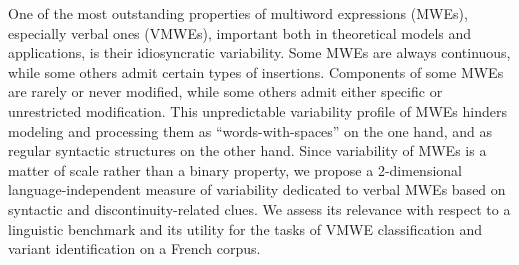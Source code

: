 One of the most outstanding properties of multiword expressions (MWEs), especially verbal ones (VMWEs), important both in theoretical models and applications, is their idiosyncratic variability. Some MWEs are always continuous, while some others admit certain types of insertions. Components of some MWEs  are rarely or never modified, while some others admit either specific or unrestricted modification. This unpredictable variability profile of MWEs hinders modeling and processing them as ``words-with-spaces'' on the one hand, and as regular syntactic structures on the other hand. Since variability of MWEs is a matter of scale rather than a binary property, we propose a 2-dimensional language-independent measure of variability dedicated to verbal MWEs based on syntactic and discontinuity-related clues. We assess its relevance with respect to a linguistic benchmark and its utility for the tasks of VMWE classification and variant identification on a French corpus.
